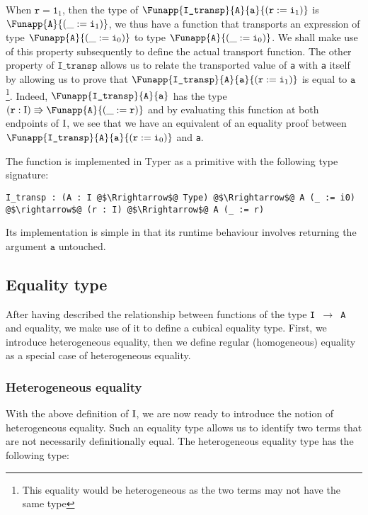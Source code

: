 \documentclass[12pt,twoside,maitrise]{dms}
\theoremstyle{definition}
\numberwithin{equation}{section}
\numberwithin{table}{chapter}
\numberwithin{figure}{chapter}
\newcommand\id[1] {\texttt{#1}}
\newcommand\fn[1] {\texttt{#1}}
\begin{document}
When $\id{r} = \id{1}_1$, then the type of
$\Funapp{\id{I\_transp}}{\id{A}}{\id{a}}{(\earg{\id{r}}{\id{i}_1})}$ is
$\Funapp{\id{A}}{(\earg{\id{i}_1})}$, we thus have a function that transports an
expression of type $\Funapp{\id{A}}{(\earg{\id{i}_0})}$ to type
$\Funapp{\id{A}}{(\earg{\id{i}_0})}$. We shall make use of this property
subsequently to define the actual transport function. The other property of
$\id{I\_transp}$ allows us to relate the transported value of \id{a} with \id{a}
itself by allowing us to prove that
$\Funapp{\id{I\_transp}}{\id{A}}{\id{a}}{(\earg{\id{r}}{\id{i}_1})}$ is equal to
$\id{a}$\footnote{This equality would be heterogeneous as the two terms may not
have the same type}. Indeed, $\Funapp{\id{I\_transp}}{\id{A}}{\id{a}}$ has the
type $(\id{r} : \bI) \Rrightarrow \Funapp{\id{A}}{(\earg{\id{r}})}$ and by
evaluating this function at both endpoints of $\mathrm{I}$, we see that we have an
equivalent of an equality proof between
$\Funapp{\id{I\_transp}}{\id{A}}{\id{a}}{(\earg{\id{r}}{\id{i}_0})}$ and \id{a}.

The function is implemented in Typer as a primitive with the following type
signature:

\begin{verbatim}
I_transp : (A : I @$\Rrightarrow$@ Type) @$\Rrightarrow$@ A (_ := i0) @$\rightarrow$@ (r : I) @$\Rrightarrow$@ A (_ := r)
\end{verbatim}

Its implementation is simple in that its runtime behaviour involves returning
the argument $\id{a}$ untouched.

\subsection{Equality type}\label{sec:identity}

After having described the relationship between functions of the type \fn{I
  $\rightarrow$ A} and equality, we make use of it to define a cubical equality
type. First, we introduce heterogeneous equality, then we define regular
(homogeneous) equality as a special case of heterogeneous equality.

\subsubsection{Heterogeneous equality}
With the above definition of $\mathrm{I}$, we are now ready to introduce the notion of
heterogeneous equality. Such an equality type allows us to identify two terms
that are not necessarily definitionally equal. The heterogeneous equality type
has the following type:
\end{document}
